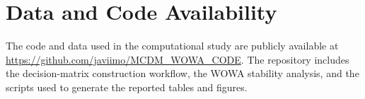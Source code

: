 \section*{Data and Code Availability}

The code and data used in the computational study are publicly available at \url{https://github.com/javiimo/MCDM_WOWA_CODE}. The repository includes the decision-matrix construction workflow, the WOWA stability analysis, and the scripts used to generate the reported tables and figures.
